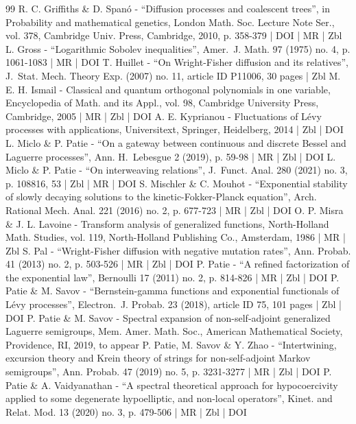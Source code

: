 \documentclass[10pt]{amsart}
\theoremstyle{plain}
\theoremstyle{definition}
\begin{document}
\begin{thebibliography}{99}
R. C. Griffiths \& D. Spanó - “Diffusion processes and coalescent trees”, in Probability and mathematical genetics, London Math. Soc. Lecture Note Ser., vol. 378, Cambridge Univ. Press, Cambridge, 2010, p. 358-379 | DOI | MR | Zbl
L. Gross - “Logarithmic Sobolev inequalities”, Amer. J. Math. 97 (1975) no. 4, p. 1061-1083 | MR | DOI
T. Huillet - “On Wright-Fisher diffusion and its relatives”, J. Stat. Mech. Theory Exp. (2007) no. 11, article ID P11006, 30 pages | Zbl
M. E. H. Ismail - Classical and quantum orthogonal polynomials in one variable, Encyclopedia of Math. and its Appl., vol. 98, Cambridge University Press, Cambridge, 2005 | MR | Zbl | DOI
A. E. Kyprianou - Fluctuations of Lévy processes with applications, Universitext, Springer, Heidelberg, 2014 | Zbl | DOI
L. Miclo \& P. Patie - “On a gateway between continuous and discrete Bessel and Laguerre processes”, Ann. H. Lebesgue 2 (2019), p. 59-98 | MR | Zbl | DOI
L. Miclo \& P. Patie - “On interweaving relations”, J. Funct. Anal. 280 (2021) no. 3, p. 108816, 53 | Zbl | MR | DOI
S. Mischler \& C. Mouhot - “Exponential stability of slowly decaying solutions to the kinetic-Fokker-Planck equation”, Arch. Rational Mech. Anal. 221 (2016) no. 2, p. 677-723 | MR | Zbl | DOI
O. P. Misra \& J. L. Lavoine - Transform analysis of generalized functions, North-Holland Math. Studies, vol. 119, North-Holland Publishing Co., Amsterdam, 1986 | MR | Zbl
S. Pal - “Wright-Fisher diffusion with negative mutation rates”, Ann. Probab. 41 (2013) no. 2, p. 503-526 | MR | Zbl | DOI
P. Patie - “A refined factorization of the exponential law”, Bernoulli 17 (2011) no. 2, p. 814-826 | MR | Zbl | DOI
P. Patie \& M. Savov - “Bernstein-gamma functions and exponential functionals of Lévy processes”, Electron. J. Probab. 23 (2018), article ID 75, 101 pages | Zbl | DOI
P. Patie \& M. Savov - Spectral expansion of non-self-adjoint generalized Laguerre semigroups, Mem. Amer. Math. Soc., American Mathematical Society, Providence, RI, 2019, to appear
P. Patie, M. Savov \& Y. Zhao - “Intertwining, excursion theory and Krein theory of strings for non-self-adjoint Markov semigroups”, Ann. Probab. 47 (2019) no. 5, p. 3231-3277 | MR | Zbl | DOI
P. Patie \& A. Vaidyanathan - “A spectral theoretical approach for hypocoercivity applied to some degenerate hypoelliptic, and non-local operators”, Kinet. and Relat. Mod. 13 (2020) no. 3, p. 479-506 | MR | Zbl | DOI

\end{thebibliography}
\end{document}
